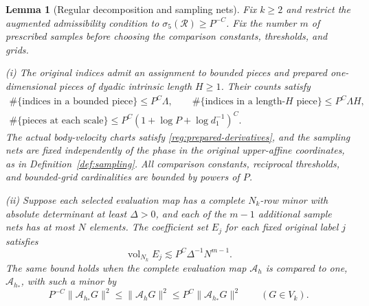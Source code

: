 \documentclass[11pt]{amsart}
\makeatletter
\newtheorem{lemma}[theorem]{Lemma}
\theoremstyle{definition}
\theoremstyle{remark}
\numberwithin{equation}{section}
\newcommand{\equationalias}[1]{\begingroup\protected@edef\@currentlabel{\p@equation\theequation}\protected@edef\@currentHref{equation.\theHequation}\label{#1}\endgroup}
\makeatother
\begin{document}
\begin{lemma}[Regular decomposition and sampling nets]\label{reg:regular-preparation}\label{low:4:cf:polynomial}
Fix $k\ge2$ and restrict the augmented admissibility condition to $\sigma_5(\mathcal R)\ge P^{-C}$. Fix the number $m$ of prescribed samples before choosing the comparison constants, thresholds, and grids.

\textup{(i)} The original indices admit an assignment to bounded pieces and prepared one-dimensional pieces of dyadic intrinsic length $H\ge1$. Their counts satisfy
\[
\begin{gathered}
\#\{\text{indices in a bounded piece}\}\le P^C\Lambda,\qquad \#\{\text{indices in a length-}H\text{ piece}\}\le P^C\Lambda H,\\
\#\{\text{pieces at each scale}\}\le P^C(1+\log P+\log d_1^{-1})^C.
\end{gathered}
\]
The actual body-velocity charts satisfy \eqref{reg:prepared-derivatives}, and the sampling nets are fixed independently of the phase in the original upper-affine coordinates, as in Definition~\ref{def:sampling}. All comparison constants, reciprocal thresholds, and bounded-grid cardinalities are bounded by powers of $P$.

\textup{(ii)} Suppose each selected evaluation map has a complete $N_k$-row minor with absolute determinant at least $\Delta>0$, and each of the $m-1$ additional sample nets has at most $N$ elements. The coefficient set $E_j$ for each fixed original label $j$ satisfies
\begin{equation}\label{reg:fixed-net-bound}
\operatorname{vol}_{N_k}E_j\lesssim P^C\Delta^{-1}N^{m-1}.
\end{equation}
\equationalias{low:78:h3r:anchor}
The same bound holds when the complete evaluation map $\mathcal A_h$ is compared to one, $\mathcal A_{h_*}$, with such a minor by
\[
P^{-C}\|\mathcal A_{h_*}G\|^2\le\|\mathcal A_hG\|^2\le P^C\|\mathcal A_{h_*}G\|^2\qquad(G\in V_k).
\]
\end{lemma}
\end{document}
